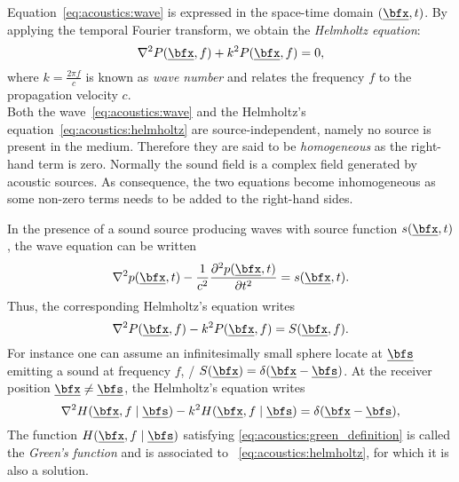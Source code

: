 Equation~\ref{eq:acoustics:wave} is expressed in the space-time domain $\depSpaceTime$.
By applying the temporal Fourier transform, we obtain the \textit{Helmholtz equation}:
\begin{equation}
    \label{eq:acoustics:helmholtz}
    \knabla^2 P(\positionMicrophone, f) + k^2 P(\positionMicrophone, f) = 0
    ,
\end{equation}
where $k = \frac{2 \pi f}{c}$  is known as \textit{wave number} and relates the frequency $f$ to the propagation velocity $c$.
\\Both the wave~\eqref{eq:acoustics:wave} and the Helmholtz's equation~\eqref{eq:acoustics:helmholtz} are source-independent, namely no source is present in the medium.
Therefore they are said to be \textit{homogeneous} as the right-hand term is zero.
Normally the sound field is a complex field generated by acoustic sources.
As consequence, the two equations become inhomogeneous as some non-zero terms needs to be added to the right-hand sides.

\mynewline
In the presence of a sound source producing waves with source function $s(\positionMicrophone,t)$, the wave equation can be written
\begin{equation}
    \label{eq:acoustics:source}
    \knabla^2 \pressureSpaceTime - \frac{1}{\speedOfSound^2} \kpderiv[2]{\pressureSpaceTime}{t} = s(\positionMicrophone,t)
    .
\end{equation}
Thus, the corresponding Helmholtz's equation writes
\begin{equation}
    \label{eq:acoustics:source_freq}
    \knabla^2 P(\positionMicrophone, f) - k^2 P(\positionMicrophone, f) = S(\positionMicrophone, f)
    .
\end{equation}
For instance one can assume an infinitesimally small sphere locate at $\positionSource$ emitting a sound at frequency $f$,
\ie/ $S(\positionMicrophone) = \delta(\positionMicrophone - \positionSource)$.
At the receiver position $\positionMicrophone \neq \positionSource$, the Helmholtz's equation writes
\begin{equation}
    \label{eq:acoustics:green_definition}
    \knabla^2 H(\positionMicrophone, f \mid \positionSource)
        - k^2 H(\positionMicrophone, f \mid \positionSource)
        = \delta(\positionMicrophone - \positionSource)
    ,
\end{equation}
The function $H(\positionMicrophone, f \mid \positionSource)$ satisfying \cref{eq:acoustics:green_definition} is called the \textit{Green's function} and is
associated to ~\cref{eq:acoustics:helmholtz}, for which it is also a solution.

